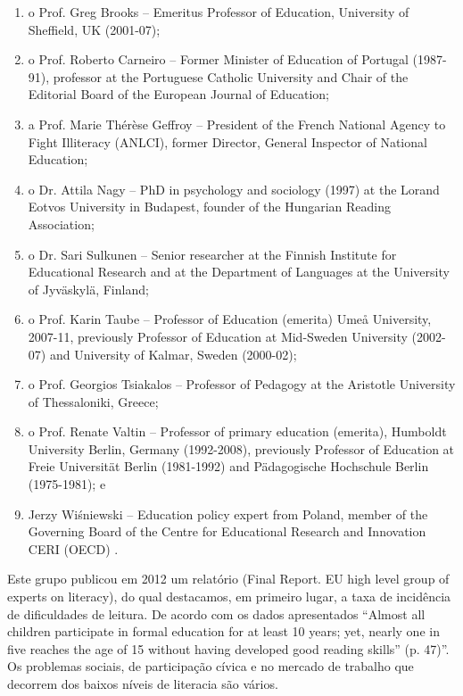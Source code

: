 \documentclass[
  oneside,
  11pt, a4paper,
  footinclude=true,
  headinclude=true,
  cleardoublepage=empty
]{scrbook}
\begin{document}
\begin{enumerate}
  \item o Prof. Greg Brooks – Emeritus Professor of  Education,  University  of  Sheffield,  UK  (2001-07);
  \item o  Prof.  Roberto Carneiro  –  Former  Minister  of  Education  of  Portugal  (1987-91), professor  at  the Portuguese Catholic University and Chair of the Editorial Board of the European Journal of Education; 
  \item a Prof. Marie Thérèse Geffroy – President of the French National Agency to Fight Illiteracy (ANLCI), former Director, General Inspector of National Education; 
  \item o Dr. Attila Nagy – PhD in psychology and sociology (1997) at the Lorand Eotvos University in Budapest, founder of the Hungarian Reading Association; 
  \item o Dr. Sari Sulkunen – Senior researcher at the Finnish Institute for Educational Research and at the Department of Languages at the University of Jyväskylä, Finland; 
  \item o Prof. Karin Taube – Professor of Education (emerita) Umeå University, 2007-11, previously Professor of Education at Mid-Sweden University (2002-07) and University of Kalmar, Sweden (2000-02); 
  \item o Prof. Georgios Tsiakalos – Professor of Pedagogy at the Aristotle University of Thessaloniki, Greece; 
  \item o Prof. Renate Valtin – Professor of primary education (emerita), Humboldt University Berlin, Germany (1992-2008), previously Professor of  Education  at  Freie  Universität  Berlin  (1981-1992) and Pädagogische Hochschule Berlin (1975-1981); e 
  \item Jerzy Wiśniewski – Education policy expert from Poland, member of the Governing Board of the Centre for Educational Research and Innovation CERI (OECD) \citep{European}.
\end{enumerate}

Este grupo publicou em 2012 um relatório (Final Report. EU high level group of experts on literacy), do qual destacamos, em primeiro lugar, a taxa de incidência de dificuldades de leitura. De acordo com os dados apresentados “Almost all children participate in formal education for at least 10 years; yet, nearly one in five reaches the age of 15 without having developed good reading skills” (p. 47)”. Os problemas sociais, de participação cívica e no mercado de trabalho que decorrem dos baixos níveis de literacia são vários. 
\end{document}
